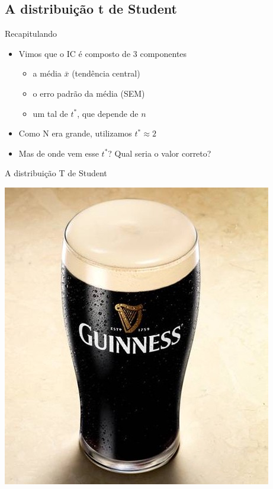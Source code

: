 \documentclass{beamer}
\begin{document}
\subsection{A distribuição t de Student}

\begin{frame}{Recapitulando}
  \begin{itemize}
  \item Vimos que o IC é composto de 3 componentes
    \begin{itemize}
    \item a média $\bar{x}$ (tendência central)
    \item o erro padrão da média (SEM)
    \item um tal de $t^{*}$, que depende de $n$
    \end{itemize}
  \item Como N era grande, utilizamos $t^{*} \approx 2$
    \bigskip
  \item Mas de onde vem esse $t^{*}$? Qual seria o valor correto?
  \end{itemize}
\end{frame}

\begin{frame}{A distribuição T de Student}
  \begin{center}
    \includegraphics[height=\textheight]{Cap5/Guinness}
  \end{center}
\end{frame}
\end{document}
